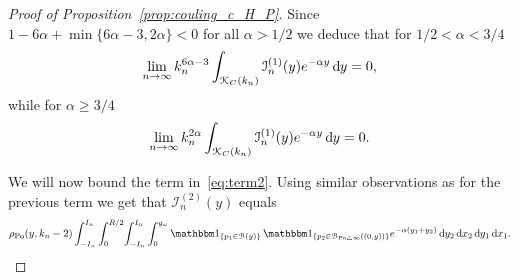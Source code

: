 \begin{proof}[Proof of Proposition~\ref{prop:couling_c_H_P}]
Since $1 - 6\alpha + \min\{6\alpha - 3, 2\alpha\} < 0$ for all $\alpha > 1/2$ we deduce that for $1/2 < \alpha < 3/4$
\[
	\lim_{n \to \infty} k_n^{6\alpha - 3} 
	\int_{{\mathcal K}_{C}(k_n)} \mathcal{I}_n^{(1)}(y) e^{-\alpha y} \operatorname{\mathrm{d}\hspace{-2pt}} y = 0,
\]
while for $\alpha \ge 3/4$
\[
	\lim_{n \to \infty} k_n^{2\alpha}  
		\int_{{\mathcal K}_{C}(k_n)} \mathcal{I}_n^{(1)}(y) e^{-\alpha y} \operatorname{\mathrm{d}\hspace{-2pt}} y = 0.
\]

We will now bound the term in~\eqref{eq:term2}. Using similar observations as for the previous term we get that $\mathcal{I}_n^{(2)}(y)$ equals
\[
	 \rho_{\Po}(y,k_n-2) \int_{-I_n}^{I_n} \int_0^{R/2} \hspace{-2pt} \int_{-I_n}^{I_n} \int_0^{y_\omega}
	 \ind{p_1 \in \BallHyp{y}} \, \ind{p_2 \in \BallSym{(0,y)}} e^{-\alpha(y_1 + y_2)} \dd y_2 
	 \dd x_2 \dd y_1 \dd x_1.
\]


\end{proof}
